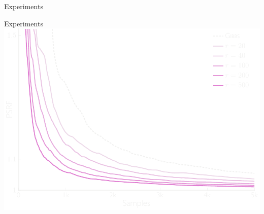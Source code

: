 \documentclass[mathserif]{beamer}
\begin{document}
\begin{frame}{Experiments}
%
\end{frame}

\begin{frame}{Experiments}
\vspace{1em}
\centering
\includegraphics[width=\textwidth,trim=0 0 0 0,clip]{figures/exp2.pdf}
\end{frame}
\end{document}
